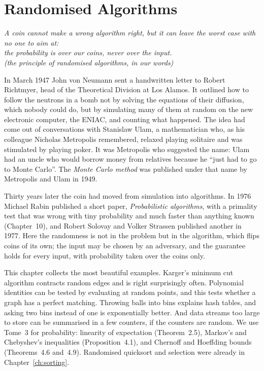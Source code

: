 \chapter{Randomised Algorithms}\label{ch:randomised}

\begin{center}\itshape
A coin cannot make a wrong algorithm right, but it can leave the worst case with no one to aim at:\\
the probability is over our coins, never over the input.\\
\upshape(the principle of randomised algorithms, in our words)
\end{center}

In March 1947 John von Neumann sent a handwritten letter to Robert Richtmyer, head of the Theoretical Division at Los Alamos. It outlined how to follow the neutrons in a
bomb not by solving the equations of their diffusion, which nobody could do, but by simulating many of them at random on the new electronic computer, the ENIAC, and counting what
happened. The idea had come out of conversations with Stanislaw Ulam, a mathematician who, as his colleague Nicholas Metropolis remembered, relaxed playing solitaire and
was stimulated by playing poker. It was Metropolis who suggested the name: Ulam had an uncle who would borrow money from relatives because he ``just had to go to Monte Carlo''.
The \emph{Monte Carlo method} was published under that name by Metropolis and Ulam in 1949.

Thirty years later the coin had moved from simulation into algorithms. In 1976 Michael Rabin published a short paper, \emph{Probabilistic algorithms}, with a primality test that
was wrong with tiny probability and much faster than anything known (Chapter~10), and Robert Solovay and Volker Strassen published another in 1977. Here the randomness is not
in the problem but in the algorithm, which flips coins of its own; the input may be chosen by an adversary, and the guarantee holds for every input, with probability taken over the coins only.

This chapter collects the most beautiful examples. Karger's minimum cut algorithm contracts random edges and is right surprisingly often. Polynomial identities can be tested by evaluating at random points,
and this tests whether a graph has a perfect matching. Throwing balls into bins explains hash tables, and asking two bins instead of one is exponentially better. And data streams too large to store can be
summarised in a few counters, if the counters are random. We use Tome~3 for probability: linearity of expectation (Theorem~2.5), Markov's and Chebyshev's inequalities (Proposition~4.1), and Chernoff and
Hoeffding bounds (Theorems~4.6 and~4.9). Randomised quicksort and selection were already in Chapter~\ref{ch:sorting}.


